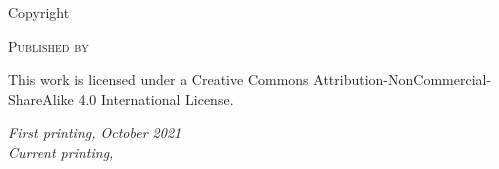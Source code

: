 \newpage
{}
\thispagestyle{empty}
\null
\vfill
\begin{fullwidth}

Copyright \textcopyright \the\year\ \@author

\par\textsc{Published by \@publishers}

\par This work is licensed under a Creative Commons Attribution-NonCommercial-ShareAlike 4.0 International License.

\par{\textit{First printing, October 2021}\\[1pt]
\textit{Current printing, \Month \ \the\year}}

\end{fullwidth}
\restoregeometry
